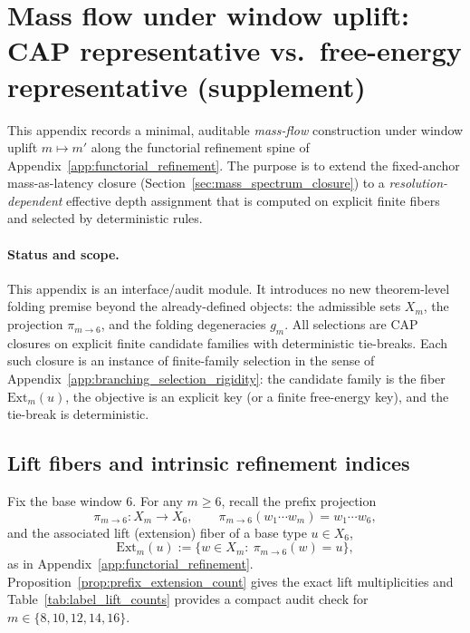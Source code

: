 \section{Mass flow under window uplift: CAP representative vs.\ free-energy representative (supplement)}
\label{app:mass_flow_under_uplift}

This appendix records a minimal, auditable \emph{mass-flow} construction under window uplift
$m\mapsto m'$ along the functorial refinement spine of Appendix~\ref{app:functorial_refinement}.
The purpose is to extend the fixed-anchor mass-as-latency closure (Section~\ref{sec:mass_spectrum_closure})
to a \emph{resolution-dependent} effective depth assignment that is computed on explicit finite fibers
and selected by deterministic rules.

\paragraph{Status and scope.}
\InterfaceTag This appendix is an interface/audit module.
It introduces no new theorem-level folding premise beyond the already-defined objects:
the admissible sets $X_m$, the projection $\pi_{m\to 6}$, and the folding degeneracies $g_m$.
All selections are CAP closures on explicit finite candidate families with deterministic tie-breaks.
\AuditTag Each such closure is an instance of finite-family selection in the sense of Appendix~\ref{app:branching_selection_rigidity}:
the candidate family is the fiber $\mathrm{Ext}_m(u)$, the objective is an explicit key (or a finite free-energy key), and the tie-break is deterministic.

\subsection{Lift fibers and intrinsic refinement indices}
\label{subsec:mass_flow_lifts}

Fix the base window $6$.
For any $m\ge 6$, recall the prefix projection
\[
\pi_{m\to 6}:X_m\to X_6,\qquad \pi_{m\to 6}(w_1\cdots w_m)=w_1\cdots w_6,
\]
and the associated lift (extension) fiber of a base type $u\in X_6$,
\[
\mathrm{Ext}_m(u):=\{w\in X_m:\ \pi_{m\to 6}(w)=u\},
\]
as in Appendix~\ref{app:functorial_refinement}.
Proposition~\ref{prop:prefix_extension_count} gives the exact lift multiplicities
and Table~\ref{tab:label_lift_counts} provides a compact audit check for $m\in\{8,10,12,14,16\}$.

